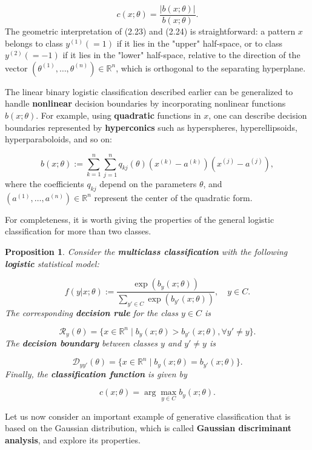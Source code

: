 \documentclass{report}
\newtheorem{proposition}{Proposition}[chapter]
\begin{document}
\begin{equation}
c(x;\theta) = \frac{|b(x;\theta)|}{b(x;\theta)}.
\end{equation}
The geometric interpretation of (2.23) and (2.24) is straightforward: a pattern $x$ belongs to class $y^{(1)} (=1)$ if it lies in the "upper" half-space, or to class $y^{(2)}(=-1)$ if it lies in the "lower" half-space, relative to the direction of the vector $(\theta^{(1)},\dots,\theta^{(n)}) \in \mathbb{R}^n$, which is orthogonal to the separating hyperplane.

The linear binary logistic classification described earlier can be generalized to handle \textbf{nonlinear} decision boundaries by incorporating nonlinear functions $b(x;\theta)$. For example, using \textbf{quadratic} functions in $x$, one can describe decision boundaries represented by \textbf{hyperconics} such as hyperspheres, hyperellipsoids, hyperparaboloids, and so on:

\begin{equation}
b(x;\theta) := \sum_{k=1}^{n}\sum_{j=1}^{n}q_{kj}(\theta)(x^{(k)}-a^{(k)})(x^{(j)} - a^{(j)}),
\end{equation}
where the coefficients $q_{kj}$ depend on the parameters $\theta$, and $(a^{(1)},\dots,a^{(n)}) \in \mathbb{R}^n$ represent the center of the quadratic form.

For completeness, it is worth giving the properties of the general logistic classification for more than two classes.

\begin{proposition}
Consider the \textbf{multiclass classification} with the following \textbf{logistic} statistical model:

\begin{equation}
f(y|x;\theta) := \frac{\exp(b_y(x;\theta))}{\sum_{y' \in C}\exp(b_{y'}(x;\theta))}, \quad y \in C.
\end{equation}
The corresponding \textbf{decision rule} for the class $y \in C$ is

\begin{equation}
\mathcal{R}_y(\theta) = \{x \in \mathbb{R}^n \mid b_y(x;\theta) > b_{y'}(x;\theta), \forall y' \neq y\}.
\end{equation}
The \textbf{decision boundary} between classes $y$ and $y' \neq y$ is

\begin{equation}
\mathcal{D}_{yy'}(\theta) = \{x \in \mathbb{R}^n \mid b_y(x;\theta) = b_{y'}(x;\theta)\}.
\end{equation}
Finally, the \textbf{classification function} is given by

\begin{equation}
c(x;\theta) = \arg \max_{y \in C} b_y(x;\theta).
\end{equation}
\end{proposition}
Let us now consider an important example of generative classification that is based on the Gaussian distribution, which is called \textbf{Gaussian discriminant analysis}, and explore its properties.
\end{document}
